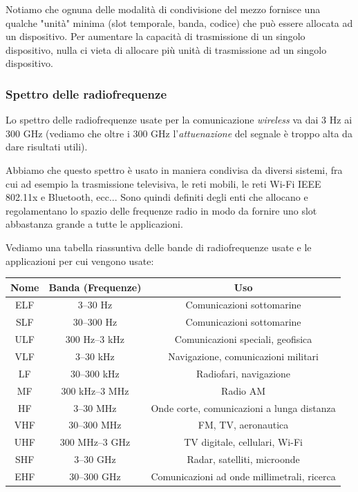 \documentclass[a4paper,11pt]{article}
\begin{document}
Notiamo che ognuna delle modalità di condivisione del mezzo fornisce una qualche "unità" minima (slot temporale, banda, codice) che può essere allocata ad un dispositivo. Per aumentare la capacità di trasmissione di un singolo dispositivo, nulla ci vieta di allocare più unità di trasmissione ad un singolo dispositivo.

\subsubsection{Spettro delle radiofrequenze}
Lo spettro delle radiofrequenze usate per la comunicazione \textit{wireless} va dai 3 Hz ai 300 GHz (vediamo che oltre i 300 GHz l'\textit{attuenazione} del segnale è troppo alta da dare risultati utili).

Abbiamo che questo spettro è usato in maniera condivisa da diversi sistemi, fra cui ad esempio la trasmissione televisiva, le reti mobili, le reti Wi-Fi IEEE 802.11x e Bluetooth, ecc...
Sono quindi definiti degli enti che allocano e regolamentano lo spazio delle frequenze radio in modo da fornire uno slot abbastanza grande a tutte le applicazioni.

Vediamo una tabella riassuntiva delle bande di radiofrequenze usate e le applicazioni per cui vengono usate:
\begin{table}[h!]
\center
{}
\begin{tabular}{ c | c | c }
\bfseries Nome & \bfseries Banda (Frequenze) & \bfseries Uso \\
\hline
ELF & 3–30 Hz & Comunicazioni sottomarine \\
SLF & 30–300 Hz & Comunicazioni sottomarine \\
ULF & 300 Hz–3 kHz & Comunicazioni speciali, geofisica \\
VLF & 3–30 kHz & Navigazione, comunicazioni militari \\
LF  & 30–300 kHz & Radiofari, navigazione \\
MF  & 300 kHz–3 MHz & Radio AM \\
HF  & 3–30 MHz & Onde corte, comunicazioni a lunga distanza \\
VHF & 30–300 MHz & FM, TV, aeronautica \\
UHF & 300 MHz–3 GHz & TV digitale, cellulari, Wi-Fi \\
SHF & 3–30 GHz & Radar, satelliti, microonde \\
EHF & 30–300 GHz & Comunicazioni ad onde millimetrali, ricerca \\
\end{tabular}
\end{table}
\end{document}
